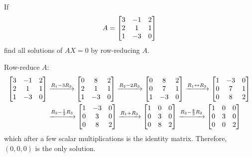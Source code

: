 \begin{xca}
  If \[ A = \begin{bmatrix}3&-1&2 \\ 2&1&1 \\ 1&-3&0\end{bmatrix} \] find all solutions of $AX = 0$ by row-reducing $A$.
\end{xca}
\begin{sol}
  Row-reduce $A$:
  \begin{equation*}
    \begin{split}
      \begin{bmatrix}3&-1&2 \\ 2&1&1 \\ 1&-3&0\end{bmatrix}
      & \xrightarrow{R_1 - 3R_3} \begin{bmatrix}0&8&2 \\ 2&1&1 \\ 1&-3&0\end{bmatrix}
      \xrightarrow{R_2 - 2R_3} \begin{bmatrix}0&8&2 \\ 0&7&1 \\ 1&-3&0\end{bmatrix}
      \xrightarrow{R_1 \leftrightarrow R_3} \begin{bmatrix}1&-3&0 \\ 0&7&1 \\ 0&8&2\end{bmatrix} \\
      & \xrightarrow{R_2 - \frac12 R_3} \begin{bmatrix}1&-3&0 \\ 0&3&0 \\ 0&8&2\end{bmatrix}
      \xrightarrow{R_1 + R_3} \begin{bmatrix}1&0&0 \\ 0&3&0 \\ 0&8&2\end{bmatrix}
      \xrightarrow{R_3 - \frac83 R_2} \begin{bmatrix}1&0&0 \\ 0&3&0 \\ 0&0&2\end{bmatrix}
    \end{split}
  \end{equation*}
  which after a few scalar multiplications is the identity matrix.
  Therefore, $(0,0,0)$ is the only solution.
\end{sol}

